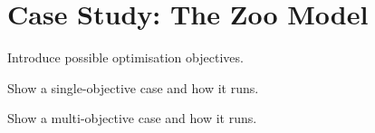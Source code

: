 \section{Case Study: The Zoo Model}
\label{section:case_study}

	\begin{draftlist}
		\item Introduce possible optimisation objectives.
		\item Show a single-objective case and how it runs.
		\item Show a multi-objective case and how it runs.
	\end{draftlist}
